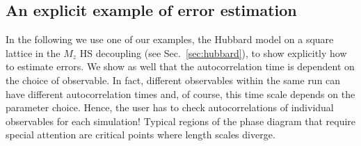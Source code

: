 %
\subsection{An explicit example of error estimation}\label{sec:autocorr}
%
In the following we use one of our examples, the Hubbard model on a square lattice in the $M_z$ HS decoupling (see Sec.~\ref{sec:hubbard}), to show explicitly how to estimate errors.  We show as well that the  autocorrelation time is dependent on the  choice of observable.  In fact, different observables within the same run can have different autocorrelation times and, of course, this time scale depends on the  parameter choice.  Hence, the user has to check  autocorrelations of individual observables for each simulation!  Typical regions of the phase diagram that require special attention are critical points  where length scales diverge.  


